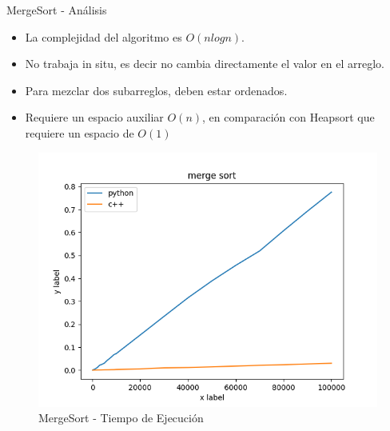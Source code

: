 \documentclass[11pt]{beamer}
\begin{document}
		\begin{frame}{MergeSort - Análisis}
            \begin{itemize}
                \item La complejidad del algoritmo es $O(n log n)$.
                \item No trabaja in situ, es decir no cambia directamente el valor en el arreglo.
                \item Para mezclar dos subarreglos, deben estar ordenados.
                \item Requiere un espacio auxiliar $O(n)$, en comparación con Heapsort que requiere un espacio de $O(1)$
            \end{itemize}
            \begin{figure}[H]
                \centering
                \includegraphics[scale=0.4]{img/merge_diagram.png}
                \caption{MergeSort - Tiempo de Ejecución}
                \label{fig:merge_diagram}
            \end{figure}
            
		\end{frame}
\end{document}
